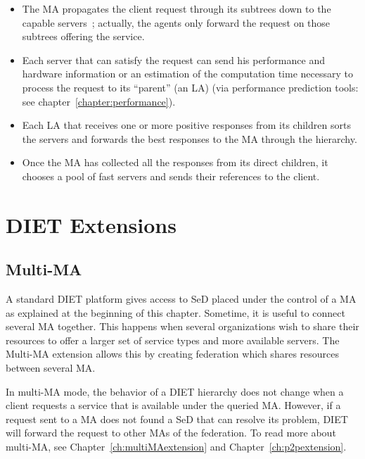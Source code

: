 \begin{itemize}
\item The MA propagates the client request through its subtrees down
  to the capable servers~; actually, the agents only forward the
  request on those subtrees offering the service.
\item Each server that can satisfy the request can send his 
  performance and hardware information or  an estimation of  the 
  computation time necessary to process the request to its ``parent'' (an LA)
  (via performance prediction tools: see chapter~\ref{chapter:performance}). 
\item Each LA that receives one or more positive responses from its
  children sorts the servers and forwards the best responses to the MA
  through the hierarchy.
\item Once the MA has collected all the responses from its direct
  children, it chooses a pool of fast servers and sends their
  references to the client.
\end{itemize}

\section{DIET Extensions}
\label{sec:extensions}

\subsection{Multi-MA}
\label{init:multima}

A standard DIET platform gives access to SeD placed under the control of a MA
as explained at the beginning of this chapter. Sometime, it is useful to
connect several MA together. This happens when several organizations wish to
share their resources to offer a larger set of service types and more available
servers. The Multi-MA extension allows this by creating federation which shares
resources between several MA.

In multi-MA mode, the behavior of a DIET hierarchy does not change when a
client requests a service that is available under the queried MA.  However, if
a request sent to a MA does not found a SeD that can resolve its problem, DIET
will forward the request to other MAs of the federation.  To read more about
multi-MA, see Chapter~\ref{ch:multiMAextension} and
Chapter~\ref{ch:p2pextension}.

